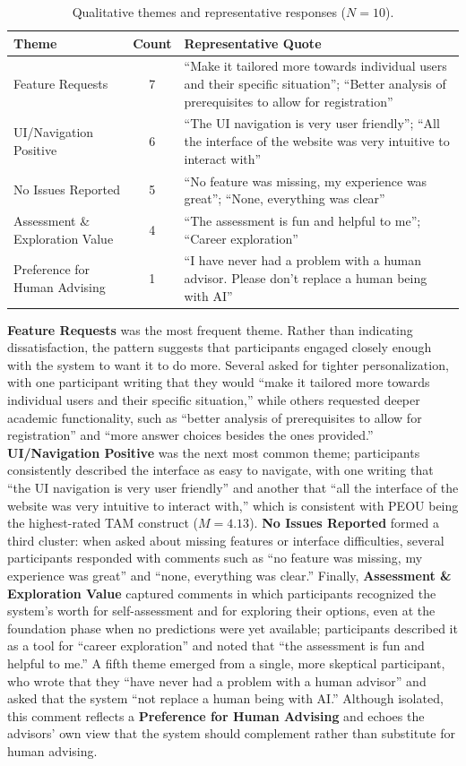 \documentclass[letterpaper,11pt]{article}
\begin{document}
\begin{table}[htbp]
\centering
\caption{Qualitative themes and representative responses ($N=10$).}
\label{tab:themes}
\begin{tabular}{@{}lcp{7cm}@{}}
\toprule
\textbf{Theme} & \textbf{Count} & \textbf{Representative Quote} \\
\midrule
Feature Requests & 7 & ``Make it tailored more towards individual users and their specific situation''; ``Better analysis of prerequisites to allow for registration'' \\
UI/Navigation Positive & 6 & ``The UI navigation is very user friendly''; ``All the interface of the website was very intuitive to interact with'' \\
No Issues Reported & 5 & ``No feature was missing, my experience was great''; ``None, everything was clear'' \\
Assessment \& Exploration Value & 4 & ``The assessment is fun and helpful to me''; ``Career exploration'' \\
Preference for Human Advising & 1 & ``I have never had a problem with a human advisor. Please don't replace a human being with AI'' \\
\bottomrule
\end{tabular}
\end{table}

\textbf{Feature Requests} was the most frequent theme. Rather than indicating dissatisfaction, the pattern suggests that participants engaged closely enough with the system to want it to do more. Several asked for tighter personalization, with one participant writing that they would ``make it tailored more towards individual users and their specific situation,'' while others requested deeper academic functionality, such as ``better analysis of prerequisites to allow for registration'' and ``more answer choices besides the ones provided.'' \textbf{UI/Navigation Positive} was the next most common theme; participants consistently described the interface as easy to navigate, with one writing that ``the UI navigation is very user friendly'' and another that ``all the interface of the website was very intuitive to interact with,'' which is consistent with PEOU being the highest-rated TAM construct ($M=4.13$). \textbf{No Issues Reported} formed a third cluster: when asked about missing features or interface difficulties, several participants responded with comments such as ``no feature was missing, my experience was great'' and ``none, everything was clear.'' Finally, \textbf{Assessment \& Exploration Value} captured comments in which participants recognized the system's worth for self-assessment and for exploring their options, even at the foundation phase when no predictions were yet available; participants described it as a tool for ``career exploration'' and noted that ``the assessment is fun and helpful to me.'' A fifth theme emerged from a single, more skeptical participant, who wrote that they ``have never had a problem with a human advisor'' and asked that the system ``not replace a human being with AI.'' Although isolated, this comment reflects a \textbf{Preference for Human Advising} and echoes the advisors' own view that the system should complement rather than substitute for human advising.
\end{document}
